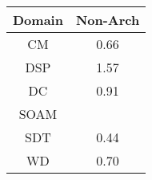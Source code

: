 \begin{tabular}{|c||c|}
\hline
Domain & Non-Arch \\ 
\hline
CM & \cellcolor[rgb]{0.8240461478944738,0.4331517667005097,0.33977640470150894} 0.66 \\ 
\hline
DSP & \cellcolor[rgb]{0.6655400993622476,0.7242032049610647,0.42000000000000004} 1.57 \\ 
\hline
DC & \cellcolor[rgb]{0.8873072469278359,0.732587635458423,0.39882009713264677} 0.91 \\ 
\hline
SOAM &  \\ 
\hline
SDT & \cellcolor[rgb]{0.7702281825359908,0.17841339733702288,0.2895463037002581} 0.44 \\ 
\hline
WD & \cellcolor[rgb]{0.8355624898676486,0.48766245204020336,0.3505249905431387} 0.70 \\ 
\hline
\end{tabular}